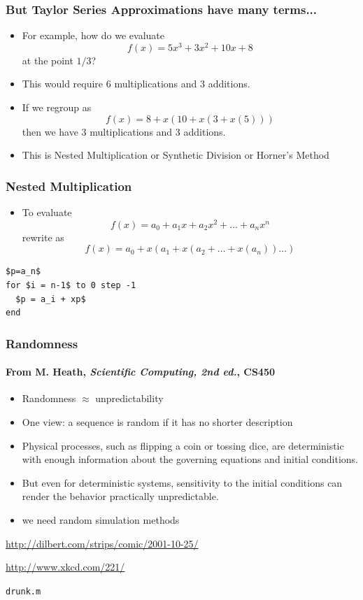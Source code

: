 \documentclass[10pt]{beamer}
\begin{document}
\begin{frame}
\frametitle{But Taylor Series Approximations have many terms...}
  \begin{itemize}
  \item For example, how do we evaluate
  \begin{equation*}
  f(x) = 5x^3 + 3x^2 + 10 x + 8
\end{equation*}
at the point $1/3$?
  
  \item This would require 6 multiplications and 3 additions.
  \item If we regroup as
  \begin{equation*}
    f(x) = 8 + x(10 + x(3 + x(5)))
\end{equation*}
        then we have 3 multiplications and 3 additions.
  \item This is Nested Multiplication or Synthetic Division or Horner's
Method
\end{itemize}
\end{frame}
\begin{frame}[fragile]
\frametitle{Nested Multiplication}
  \begin{itemize}
    \item To evaluate
      \begin{equation*}
        f(x) = a_0 + a_1x + a_2 x^2 + \dots + a_n x^n
\end{equation*}
rewrite as
      \begin{equation*}
        f(x) = a_0 + x(a_1 + x(a_2 + \dots + x(a_n))\dots)
\end{equation*}
\end{itemize}
\begin{lstlisting}[mathescape,caption=nested mult]
$p=a_n$
for $i = n-1$ to 0 step -1
  $p = a_i + xp$
end
\end{lstlisting}
\end{frame}
\begin{frame}
\frametitle{Randomness}
\framesubtitle{From M. Heath, \emph{Scientific Computing, 2nd ed.}, CS450}
\begin{itemize}
    \item Randomness $\approx$ unpredictability
    \item One view: a sequence is random if it has no shorter description
    \item Physical processes, such as flipping a coin or tossing dice, are
deterministic with enough information about the governing equations and initial
conditions.
    \item But even for deterministic systems, sensitivity to the initial
conditions can render the behavior practically unpredictable.
    \item we need random simulation methods
\end{itemize}
\bigskip

\url{http://dilbert.com/strips/comic/2001-10-25/}

\url{http://www.xkcd.com/221/}

\texttt{drunk.m}
\end{frame}
\end{document}
